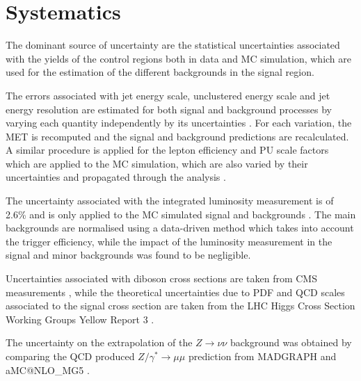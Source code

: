 \section{Systematics}


The dominant source of uncertainty are the statistical uncertainties associated with the yields of the control regions both in data and \gls{MC} simulation, which are used for the estimation of the different backgrounds in the signal region. 

The errors associated with jet energy scale, unclustered energy scale and jet energy resolution are estimated for both signal and background processes by varying each quantity independently by its uncertainties \cite{ARTICLE:CMSDeterminationJetEnergyCalibration}. For each variation, the \gls{MET} is recomputed and the signal and background predictions are recalculated. A similar procedure is applied for the lepton efficiency and \gls{PU} scale factors which are applied to the \gls{MC} simulation, which are also varied by their uncertainties and propagated through the analysis \cite{ARTICLE:CMSMuonReconstruction7TeV,ARTICLE:CMSElectronReconstruction8TeV}.

The uncertainty associated with the integrated luminosity measurement is of 2.6\% and is only applied to the \gls{MC} simulated signal and backgrounds \cite{ARTICLE:CMSLuminosityBasedonPixelClusterCounting}. The main backgrounds are normalised using a data-driven method which takes into account the trigger efficiency, while the impact of the luminosity measurement in the signal and minor backgrounds was found to be negligible.

Uncertainties associated with diboson cross sections are taken from \gls{CMS} measurements \cite{ARTICLE:CMSMeasurmentOfWWandZZxsec}, while the theoretical uncertainties due to \gls{PDF} and \gls{QCD} scales associated to the signal cross section are taken from the \gls{LHC} Higgs Cross Section Working Groups Yellow Report 3 \cite{ARTICLE:HandbookofLHCHiggsCrossSectionsInclusiveObservables,ARTICLE:HandbookofLHCHiggsCrossSectionsDifferentialDistributions}.

The uncertainty on the extrapolation of the  $Z\rightarrow\nu\nu$ background was obtained by comparing the \gls{QCD} produced $Z/\gamma^{*}\rightarrow\mu\mu$ prediction from \textsc{MADGRAPH} and a\textsc{MC@NLO\_MG5} \cite{ARTICLE:aMCatNLO}.

